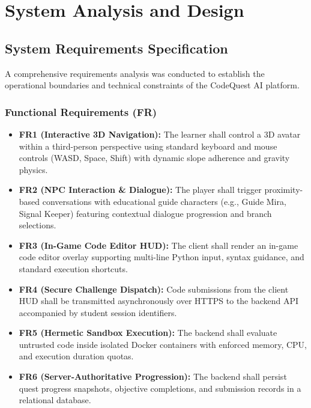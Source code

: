 \chapter{System Analysis and Design}
\label{ch:system_analysis}

\section{System Requirements Specification}
A comprehensive requirements analysis was conducted to establish the operational boundaries and technical constraints of the CodeQuest AI platform.

\subsection{Functional Requirements (FR)}
\begin{itemize}
    \item \textbf{FR1 (Interactive 3D Navigation):} The learner shall control a 3D avatar within a third-person perspective using standard keyboard and mouse controls (WASD, Space, Shift) with dynamic slope adherence and gravity physics.
    \item \textbf{FR2 (NPC Interaction \& Dialogue):} The player shall trigger proximity-based conversations with educational guide characters (e.g., Guide Mira, Signal Keeper) featuring contextual dialogue progression and branch selections.
    \item \textbf{FR3 (In-Game Code Editor HUD):} The client shall render an in-game code editor overlay supporting multi-line Python input, syntax guidance, and standard execution shortcuts.
    \item \textbf{FR4 (Secure Challenge Dispatch):} Code submissions from the client HUD shall be transmitted asynchronously over HTTPS to the backend API accompanied by student session identifiers.
    \item \textbf{FR5 (Hermetic Sandbox Execution):} The backend shall evaluate untrusted code inside isolated Docker containers with enforced memory, CPU, and execution duration quotas.
    \item \textbf{FR6 (Server-Authoritative Progression):} The backend shall persist quest progress snapshots, objective completions, and submission records in a relational database.
\end{itemize}

